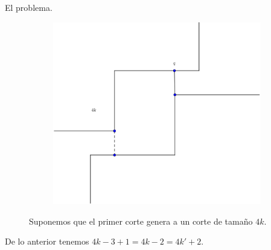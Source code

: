 \begin{frame}{El problema.}
\begin{figure}
\begin{subfigure}[b]{0.25\paperwidth}
    \end{subfigure}
    \begin{subfigure}[b]{0.25\paperwidth}
      \includegraphics[width=.3 \paperwidth]{./images/EjemplarC1.png}
    \end{subfigure}
    \caption*{Suponemos que el primer corte genera a un corte de tamaño $4k$.}
  \end{figure}
  De lo anterior tenemos $4k - 3 + 1 = 4k - 2 = 4k' + 2$.\newline
  
\end{frame}


